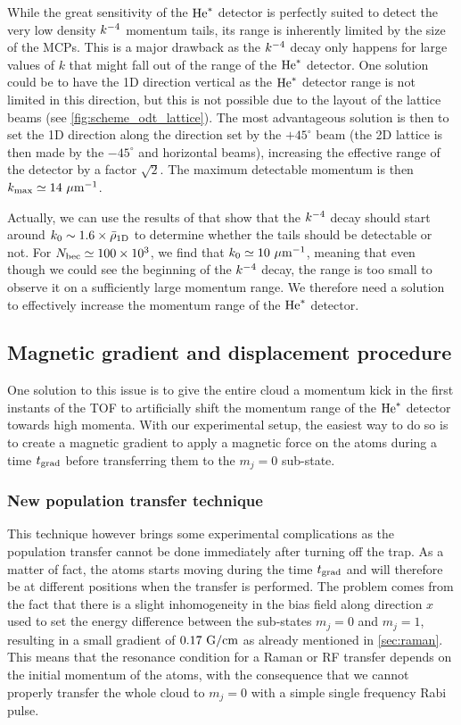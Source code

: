 \label{sec:large_momentum_detection}

While the great sensitivity of the $\mathrm{He}^*$ detector is perfectly suited to detect the very low density $k^{-4}$ momentum tails, its range is inherently limited by the size of the MCPs. This is a major drawback as the $k^{-4}$ decay only happens for large values of $k$ that might fall out of the range of the $\mathrm{He}^*$ detector. One solution could be to have the 1D direction vertical as the $\mathrm{He}^*$ detector range is not limited in this direction, but this is not possible due to the layout of the lattice beams (see \ref{fig:scheme_odt_lattice}). The most advantageous solution is then to set the 1D direction along the direction set by the $+45^{\circ}$ beam (the 2D lattice is then made by the $-45^{\circ}$ and horizontal beams), increasing the effective range of the detector by a factor $\sqrt{2}$. The maximum detectable momentum is then $k_{\rm{max}} \simeq 14 \ \mu \rm{m}^{-1}$.

Actually, we can use the results of \cite{xu2015universal} that show that the $k^{-4}$ decay should start around $k_0 \sim 1.6 \times \bar{\rho}_{\rm{1D}}$ to determine whether the tails should be detectable or not. For $N_{\rm{bec}} \simeq 100 \times 10^3$, we find that $k_0 \simeq 10 \ \mu \rm{m}^{-1}$, meaning that even though we could see the beginning of the $k^{-4}$ decay, the range is too small to observe it on a sufficiently large momentum range. We therefore need a solution to effectively increase the momentum range of the $\mathrm{He}^*$ detector.

\subsection{Magnetic gradient and displacement procedure}

One solution to this issue is to give the entire cloud a momentum kick in the first instants of the TOF to artificially shift the momentum range of the $\mathrm{He}^*$ detector towards high momenta. With our experimental setup, the easiest way to do so is to create a magnetic gradient to apply a magnetic force on the atoms during a time $t_{\rm{grad}}$ before transferring them to the $m_j=0$ sub-state. 

\subsubsection{New population transfer technique}

This technique however brings some experimental complications as the population transfer cannot be done immediately after turning off the trap. As a matter of fact, the atoms starts moving during the time $t_{\rm{grad}}$ and will therefore be at different positions when the transfer is performed. The problem comes from the fact that there is a slight inhomogeneity in the bias field along direction $x$ used to set the energy difference between the sub-states $m_j=0$ and $m_j=1$, resulting in a small gradient of $0.17 \ \rm{G/cm}$ as already mentioned in \ref{sec:raman}. This means that the resonance condition for a Raman or RF transfer depends on the initial momentum of the atoms, with the consequence that we cannot properly transfer the whole cloud to $m_j=0$ with a simple single frequency Rabi pulse.


